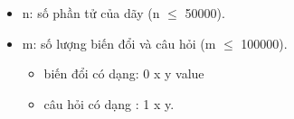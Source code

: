 \begin{itemize}
	\item n: số phần tử của dãy (n  $\le$  50000).
	\item m: số lượng biến đổi và câu hỏi (m  $\le$  100000).
\begin{itemize}
	\item biến đổi có dạng: 0 x y value
	\item câu hỏi có dạng : 1 x y.
\end{itemize}
\end{itemize}